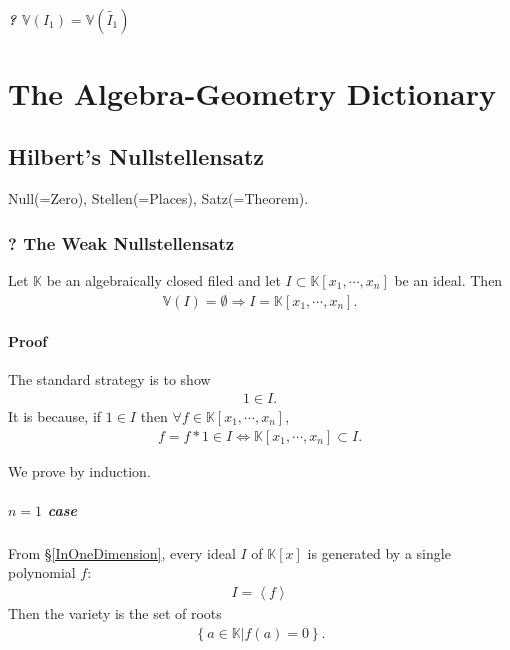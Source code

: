 \documentclass[11pt]{book}
\begin{document}
\paragraph{? $\mathbb{V}(I_1) = \mathbb{V}(\tilde{I_1})$}






\chapter{The Algebra-Geometry Dictionary}
\section{Hilbert's Nullstellensatz}
Null(=Zero), Stellen(=Places), Satz(=Theorem).

\subsection{? The Weak Nullstellensatz}
Let $\mathbb{K}$ be an algebraically closed filed and let $I \subset \mathbb{K}[x_1, \cdots, x_n]$ be an ideal.
Then
\begin{eqnarray}
\mathbb{V}(I) = \emptyset \Rightarrow I = \mathbb{K}[x_1, \cdots, x_n].
\end{eqnarray}

\subsubsection{Proof}
The standard strategy is to show
\begin{eqnarray}
1 \in I.
\end{eqnarray}
It is because, if $1 \in I$ then $\forall f \in \mathbb{K}[x_1, \cdots, x_n]$,
\begin{eqnarray}
f = f * 1 \in I \Leftrightarrow \mathbb{K}[x_1, \cdots, x_n] \subset I.
\end{eqnarray}

We prove by induction.

\paragraph{$n=1$ case}
From \S\ref{InOneDimension}, every ideal $I$ of $\mathbb{K}[x]$ is generated by a single polynomial $f$:
\begin{eqnarray}
I = \left< f\right>
\end{eqnarray}
Then the variety is the set of roots
\begin{eqnarray}
\left\{ \left. a \in \mathbb{K} \right| f(a) = 0 \right\}.
\end{eqnarray}
\end{document}
